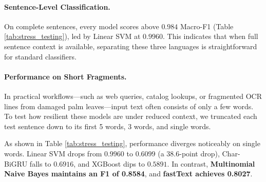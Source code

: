 \documentclass[11pt]{article}
\begin{document}
\begin{table}[t]
\centering
\small
\setlength{\tabcolsep}{3pt}
\caption{Macro-F1 of baseline architectures trained from scratch across varying input lengths on held-out target test data ($N=7,047$).}
\label{tab:stress_testing}
\end{table}

\paragraph{Sentence-Level Classification.}
On complete sentences, every model scores above $0.984$ Macro-F1 (Table \ref{tab:stress_testing}), led by Linear SVM at $0.9960$. This indicates that when full sentence context is available, separating these three languages is straightforward for standard classifiers.

\paragraph{Performance on Short Fragments.}
In practical workflows---such as web queries, catalog lookups, or fragmented OCR lines from damaged palm leaves---input text often consists of only a few words. To test how resilient these models are under reduced context, we truncated each test sentence down to its first 5 words, 3 words, and single words.

As shown in Table \ref{tab:stress_testing}, performance diverges noticeably on single words. Linear SVM drops from $0.9960$ to $0.6099$ (a 38.6-point drop), Char-BiGRU falls to $0.6916$, and XGBoost dips to $0.5891$. In contrast, \textbf{Multinomial Naive Bayes maintains an F1 of 0.8584}, and \textbf{fastText achieves 0.8027}.
\end{document}
